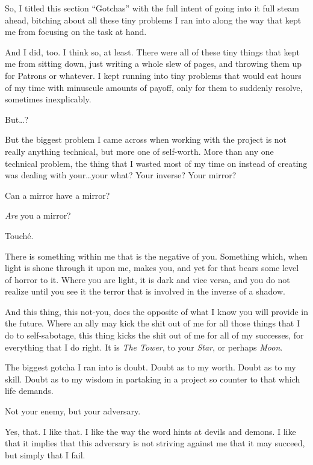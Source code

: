 \begin{paracol}{2}
\begin{rightcolumn}
  So, I titled this section ``Gotchas'' with the full intent of going into it full steam ahead, bitching about all these tiny problems I ran into along the way that kept me from focusing on the task at hand.

  And I did, too. I think so, at least. There were all of these tiny things that kept me from sitting down, just writing a whole slew of pages, and throwing them up for Patrons or whatever. I kept running into tiny problems that would eat hours of my time with minuscule amounts of payoff, only for them to suddenly resolve, sometimes inexplicably.

  \begin{ally}
    But\ldots{}?
  \end{ally}
  But the biggest problem I came across when working with the project is not really anything technical, but more one of self-worth. More than any one technical problem, the thing that I wasted most of my time on instead of creating was dealing with your\ldots{}your what? Your inverse? Your mirror?

  \begin{ally}
    Can a mirror have a mirror?
  \end{ally}
  \emph{Are} you a mirror?

  \begin{ally}
    Touché.
  \end{ally}
  There is something within me that is the negative of you. Something which, when light is shone through it upon me, makes you, and yet for that bears some level of horror to it. Where you are light, it is dark and vice versa, and you do not realize until you see it the terror that is involved in the inverse of a shadow.

  And this thing, this not-you, does the opposite of what I know you will provide in the future. Where an ally may kick the shit out of me for all those things that I do to self-sabotage, this thing kicks the shit out of me for all of my successes, for everything that I do right. It is \emph{The Tower}, to your \emph{Star}, or perhaps \emph{Moon}.

  The biggest gotcha I ran into is doubt. Doubt as to my worth. Doubt as to my skill. Doubt as to my wisdom in partaking in a project so counter to that which life demands.

  \begin{ally}
    Not your enemy, but your adversary.
  \end{ally}
  Yes, that. I like that. I like the way the word hints at devils and demons. I like that it implies that this adversary is not striving against me that it may succeed, but simply that I fail.


\end{rightcolumn}
\end{paracol}
